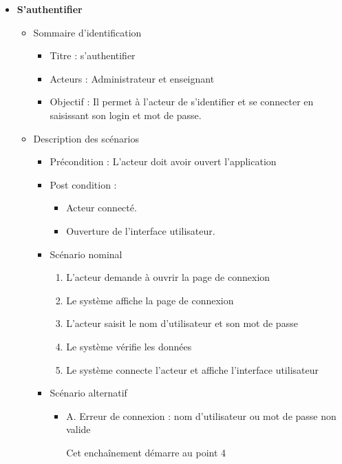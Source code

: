 \begin{itemize}
	\item \textbf{S’authentifier}
	      \begin{itemize}
		      \item Sommaire d’identification
		            \begin{itemize}
			            \item Titre : s’authentifier
			            \item Acteurs : Administrateur et enseignant
			            \item Objectif : Il permet à l’acteur de s’identifier et se connecter en saisissant son login et mot de passe.
		            \end{itemize}
		      \item Description des scénarios
		            \begin{itemize}
			            \item Précondition : L’acteur doit avoir ouvert l’application
			            \item Post condition :
			                  \begin{itemize}
				                  \item Acteur connecté.
				                  \item Ouverture de l’interface utilisateur.
			                  \end{itemize}
			            \item Scénario nominal
			                  \begin{enumerate}
				                  \item L’acteur demande à ouvrir la page de connexion
				                  \item Le système affiche la page de connexion
				                  \item L’acteur saisit le nom d’utilisateur et son mot de passe
				                  \item Le système vérifie les données
				                  \item Le système connecte l’acteur et affiche l’interface utilisateur
			                  \end{enumerate}
			            \item Scénario alternatif
			                  \begin{itemize}
				                  \item A. Erreur de connexion : nom d'utilisateur ou mot de passe non valide

				                        Cet enchaînement démarre au point 4


\end{itemize}
\end{itemize}
\end{itemize}
\end{itemize}
